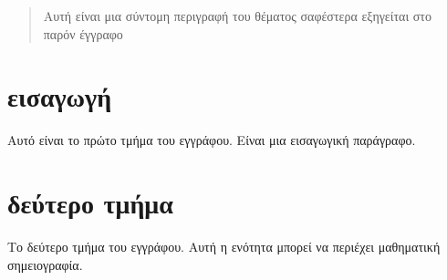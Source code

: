 \documentclass{article}
\begin{document}
\tableofcontents

\begin{abstract}
Αυτή είναι μια σύντομη περιγραφή του θέματος 
σαφέστερα εξηγείται στο παρόν έγγραφο
\end{abstract}

\section{εισαγωγή}
Αυτό είναι το πρώτο τμήμα του εγγράφου. 
Είναι μια εισαγωγική παράγραφο.

\section{δεύτερο τμήμα}
Το δεύτερο τμήμα του εγγράφου. Αυτή η ενότητα 
μπορεί να περιέχει μαθηματική σημειογραφία.
\end{document}
